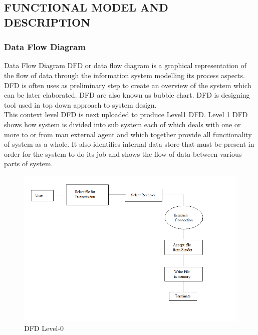 \documentclass[12pt,a4paper]
{article}
\numberwithin{table}{section}
\begin{document}
{{{{{{	\newpage



\subsection{FUNCTIONAL MODEL AND DESCRIPTION}
\subsubsection{Data Flow Diagram}
Data Flow Diagram DFD or data flow diagram is a graphical representation of the flow of data through the information system modelling its process aspects. DFD is often uses as preliminary step to create an overview of the system which can be later elaborated. DFD are also known as bubble chart. DFD is designing tool used in top down approach to system design. \\ This context level DFD is next uploaded to produce Level1 DFD. Level 1 DFD shows how system is divided into sub system each of which deals with one or more to or from man external agent and which together provide all functionality of system as a whole. It also identifies internal data store that must be present in order for the system to do its job and shows the flow of data between various parts of system.
\begin{center}
	  \begin{figure}[h]
			\centering
			\includegraphics[width=18 cm , height= 12 cm]{DFD.PNG}
			\caption{DFD Level-0}
		\end{figure}
	\end{center}
	
}}}}}}
\end{document}
